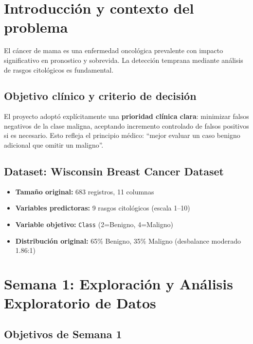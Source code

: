 \documentclass[11pt,a4paper]{article}
\begin{document}
\section{Introducción y contexto del problema}

El cáncer de mama es una enfermedad oncológica prevalente con impacto significativo en pronostico y sobrevida. La detección temprana mediante análisis de rasgos citológicos es fundamental.

\subsection{Objetivo clínico y criterio de decisión}

El proyecto adoptó explícitamente una \textbf{prioridad clínica clara}: minimizar falsos negativos de la clase maligna, aceptando incremento controlado de falsos positivos si es necesario. Esto refleja el principio médico: ``mejor evaluar un caso benigno adicional que omitir un maligno''.

\subsection{Dataset: Wisconsin Breast Cancer Dataset}

\begin{itemize}[leftmargin=1.4cm]
\item \textbf{Tamaño original:} 683 registros, 11 columnas
\item \textbf{Variables predictoras:} 9 rasgos citológicos (escala 1--10)
\item \textbf{Variable objetivo:} \texttt{Class} (2=Benigno, 4=Maligno)
\item \textbf{Distribución original:} 65\% Benigno, 35\% Maligno (desbalance moderado 1.86:1)
\end{itemize}

\section{Semana 1: Exploración y Análisis Exploratorio de Datos}

\subsection{Objetivos de Semana 1}
\end{document}
